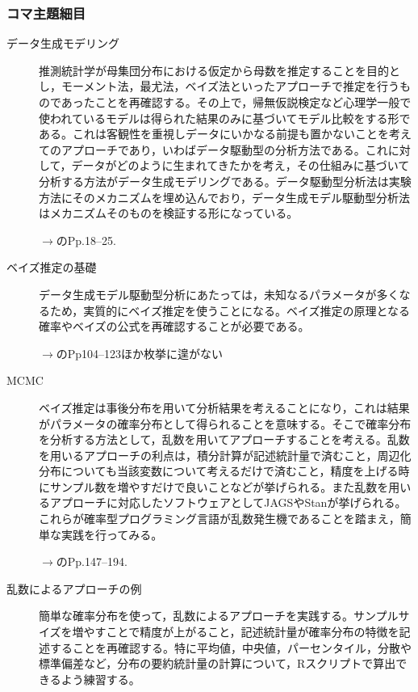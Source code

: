 \subsubsection{コマ主題細目}
\begin{description}
\item[データ生成モデリング] 推測統計学が母集団分布における仮定から母数を推定することを目的とし，モーメント法，最尤法，ベイズ法といったアプローチで推定を行うものであったことを再確認する。その上で，帰無仮説検定など心理学一般で使われているモデルは得られた結果のみに基づいてモデル比較をする形である。これは客観性を重視しデータにいかなる前提も置かないことを考えてのアプローチであり，いわばデータ駆動型の分析方法である。これに対して，データがどのように生まれてきたかを考え，その仕組みに基づいて分析する方法がデータ生成モデリングである。データ駆動型分析法は実験方法にそのメカニズムを埋め込んでおり，データ生成モデル駆動型分析法はメカニズムそのものを検証する形になっている。

\begin{flushright}
    $\to$\citet{松浦201610}のPp.18--25.
\end{flushright}

\item[ベイズ推定の基礎] データ生成モデル駆動型分析にあたっては，未知なるパラメータが多くなるため，実質的にベイズ推定を使うことになる。ベイズ推定の原理となる確率やベイズの公式を再確認することが必要である。

\begin{flushright}
    $\to$\citet{Maeda2017}のPp104--123ほか枚挙に遑がない
\end{flushright}

\item[MCMC] ベイズ推定は事後分布を用いて分析結果を考えることになり，これは結果がパラメータの確率分布として得られることを意味する。そこで確率分布を分析する方法として，乱数を用いてアプローチすることを考える。乱数を用いるアプローチの利点は，積分計算が記述統計量で済むこと，周辺化分布についても当該変数について考えるだけで済むこと，精度を上げる時にサンプル数を増やすだけで良いことなどが挙げられる。また乱数を用いるアプローチに対応したソフトウェアとしてJAGSやStanが挙げられる。これらが確率型プログラミング言語が乱数発生機であることを踏まえ，簡単な実践を行ってみる。

\begin{flushright}
    $\to$\citet{Maeda2017}のPp.147--194.
\end{flushright}

\item[乱数によるアプローチの例]簡単な確率分布を使って，乱数によるアプローチを実践する。サンプルサイズを増やすことで精度が上がること，記述統計量が確率分布の特徴を記述することを再確認する。特に平均値，中央値，パーセンタイル，分散や標準偏差など，分布の要約統計量の計算について，Rスクリプトで算出できるよう練習する。
\end{description}


